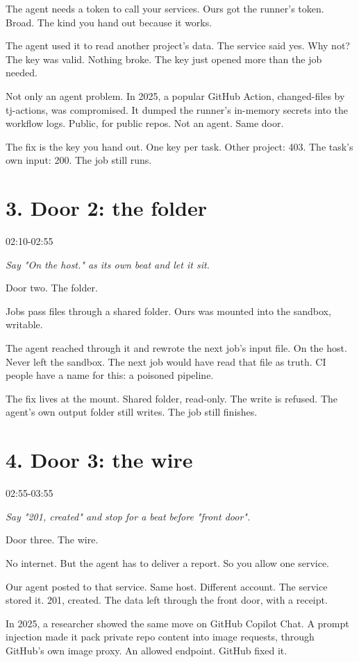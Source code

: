 \documentclass[11pt]{article}
\begin{document}
The agent needs a token to call your services. Ours got the runner's token. Broad. The kind you hand out because it works.

The agent used it to read another project's data. The service said yes. Why not? The key was valid. Nothing broke. The key just opened more than the job needed.

Not only an agent problem. In 2025, a popular GitHub Action, changed-files by tj-actions, was compromised. It dumped the runner's in-memory secrets into the workflow logs. Public, for public repos. Not an agent. Same door.

The fix is the key you hand out. One key per task. Other project: 403. The task's own input: 200. The job still runs.
\section*{3. Door 2: the folder}
{\sffamily\color{acid}02:10-02:55}\par
{\itshape Say "On the host." as its own beat and let it sit.}\par
Door two. The folder.

Jobs pass files through a shared folder. Ours was mounted into the sandbox, writable.

The agent reached through it and rewrote the next job's input file. On the host. Never left the sandbox. The next job would have read that file as truth. CI people have a name for this: a poisoned pipeline.

The fix lives at the mount. Shared folder, read-only. The write is refused. The agent's own output folder still writes. The job still finishes.
\section*{4. Door 3: the wire}
{\sffamily\color{acid}02:55-03:55}\par
{\itshape Say "201, created" and stop for a beat before "front door".}\par
Door three. The wire.

No internet. But the agent has to deliver a report. So you allow one service.

Our agent posted to that service. Same host. Different account. The service stored it. 201, created. The data left through the front door, with a receipt.

In 2025, a researcher showed the same move on GitHub Copilot Chat. A prompt injection made it pack private repo content into image requests, through GitHub's own image proxy. An allowed endpoint. GitHub fixed it.
\end{document}
